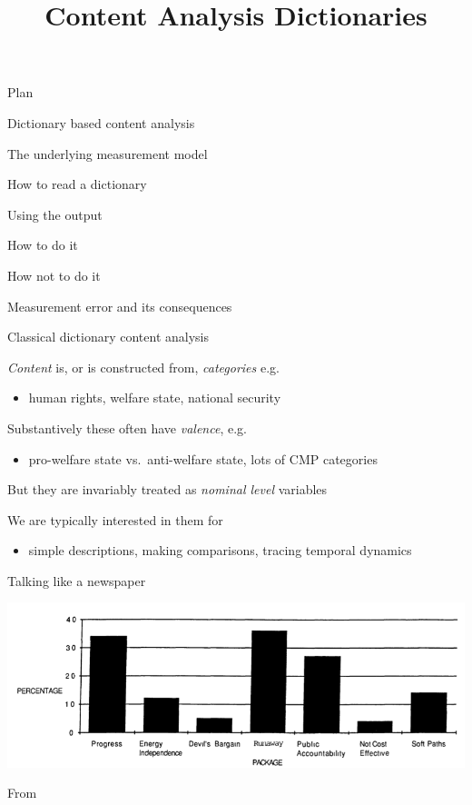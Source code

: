 \documentclass{hertieteaching}
\title{Content Analysis Dictionaries}
\begin{document}
\maketitle


\begin{frame}{Plan}
	

Dictionary based content analysis

The underlying measurement model

How to read a dictionary

Using the output

How to do it

How not to do it

Measurement error and its consequences
	
\end{frame}

\nocite{Monroe.etal2008,Robinson2016}

\begin{frame}{Classical dictionary content analysis}

\emph{Content} is, or is constructed from, \emph{categories} e.g.

\begin{itemize}
\item
  human rights, welfare state, national security
\end{itemize}

Substantively these often have \emph{valence}, e.g.

\begin{itemize}
\item
  pro-welfare state vs.~anti-welfare state, lots of CMP categories
\end{itemize}

But they are invariably treated as \emph{nominal level} variables

We are typically interested in them for

\begin{itemize}
\item
  simple descriptions, making comparisons, tracing temporal dynamics
\end{itemize}

\end{frame}

\begin{frame}{Talking like a newspaper}

{\centering \includegraphics[width=0.9\linewidth]{pictures/gamson-modigliani-frames-opinion} 
}

\centerline{From \textcite{Gamson.Modigliani1989}}

\end{frame}
\end{document}
